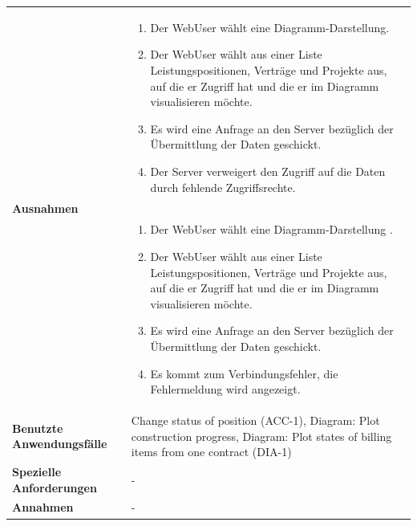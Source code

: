 \begin{longtable}[c]{|p{4cm}|p{10cm}|}
    \multirow{2}{*}{\textbf{Ausnahmen}} &
    \begin{enumerate} %
        \item Der WebUser wählt eine Diagramm-Darstellung.
        \item Der WebUser wählt aus einer Liste Leistungspositionen, Verträge und Projekte aus, auf die er Zugriff hat und die er im Diagramm visualisieren möchte.
        \item Es wird eine Anfrage an den Server bezüglich der Übermittlung der Daten geschickt.
        \item Der Server verweigert den Zugriff auf die Daten durch fehlende Zugriffsrechte.
    \end{enumerate}                                                                                                                                                                                                                                 \\\cline{2-2} &
    \begin{enumerate} %
        \item Der WebUser wählt eine Diagramm-Darstellung .
        \item Der WebUser wählt aus einer Liste Leistungspositionen, Verträge und Projekte aus, auf die er Zugriff hat und die er im Diagramm visualisieren möchte.
        \item Es wird eine Anfrage an den Server bezüglich der Übermittlung der Daten geschickt.
        \item Es kommt zum Verbindungsfehler, die Fehlermeldung wird angezeigt.
    \end{enumerate}                                                                                                                                                                                                                                 \\ \hline
    \textbf{Benutzte Anwendungsfälle}   & Change status of position (ACC-1), Diagram: Plot construction progress, Diagram: Plot states of billing items from one contract (DIA-1)                                                                                                                                                               \\ \hline
    \textbf{Spezielle Anforderungen}    & -                                                                                                                                                                                                                    \\ \hline
    \textbf{Annahmen}                   & -                                                                                                                                                                                                                    \\ \hline
\end{longtable}